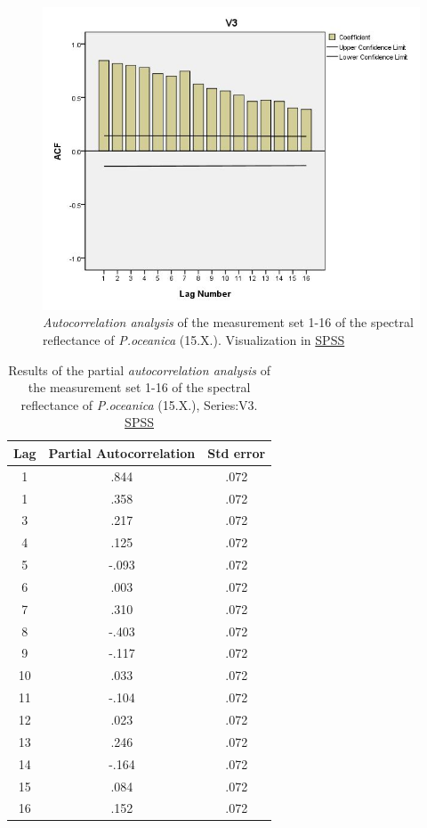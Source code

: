 \documentclass[10pt, a4paper]{article}
\begin{document}
\begin{appendices}
\begin{figure}[H]
	\centering
	\includegraphics[scale=0.45]{Autocorr.jpg}
	\caption{\textit{Autocorrelation analysis} of the measurement set 1-16 of the spectral reflectance of \textit{P.oceanica} (15.X.). Visualization in \href{http://www.spss.com/}{SPSS}}
	\label{fig:A.21}
\end{figure}
\pagebreak
\newpage

\begin{table}[htbp]
	\caption{Results of the partial \textit{autocorrelation analysis} of the measurement set 1-16 of the spectral reflectance of \textit{P.oceanica} (15.X.), Series:V3. \href{http://www.spss.com/}{SPSS}}\label{tab:14}
	\begin{center}
	\begin{tabular}{|c|c|c|}
		\hline\hline
			Lag & Partial Autocorrelation & Std error\\ \hline\hline
			1 & .844 & .072 \\ \hline
			1 &.358 & .072 \\ \hline
			3 & .217 &.072 \\ \hline
			4 & .125 &.072 \\ \hline
			5 & -.093 & .072 \\ \hline
			6 & .003 & .072 \\ \hline
			7 & .310 & .072 \\ \hline
			8 & -.403 & .072 \\ \hline
			9 & -.117 & .072 \\ \hline
			10 & .033 & .072 \\ \hline
			11 & -.104 & .072 \\ \hline
			12 & .023 &.072 \\ \hline
			13 & .246 &.072 \\ \hline
			14 & -.164 & .072 \\ \hline
			15 & .084 & .072 \\ \hline
			16 & .152 & .072 \\ \hline
	\end{tabular}
	\end{center}
\end{table}


\end{appendices}
\end{document}
